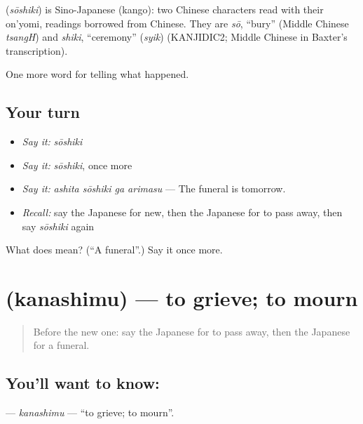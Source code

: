 \begin{cousinweb}
\textbf{} (\emph{sōshiki}) is Sino-Japanese (kango): two Chinese characters read with their on'yomi, readings borrowed from Chinese. They are \emph{sō}, \textquotedblleft{}bury\textquotedblright{} (Middle Chinese \emph{tsangH}) and \emph{shiki}, \textquotedblleft{}ceremony\textquotedblright{} (\emph{syik}) (KANJIDIC2; Middle Chinese in Baxter's transcription).
\end{cousinweb}

\begin{grammarlens}[title={What you've built}]
One more word for telling what happened.
\end{grammarlens}

\subsection*{Your turn}
\begin{itemize}
\raggedright
  \item \emph{Say it:} \emph{sōshiki}
  \item \emph{Say it:} \emph{sōshiki}, once more
  \item \emph{Say it:} \emph{ashita sōshiki ga arimasu} — The funeral is tomorrow.
  \item \emph{Recall:} say the Japanese for new, then the Japanese for to pass away, then say \emph{sōshiki} again
\end{itemize}

\begin{tcolorbox}[breakable,colback=teal!4,colframe=teal!35!black,title={Before you move on}]
What does  mean? (\textquotedblleft{}A funeral\textquotedblright{}.) Say it once more.
\end{tcolorbox}
\section[\texorpdfstring{\ja{かなしむ} (kanashimu)}{かなしむ (kanashimu)}]{ (kanashimu) — to grieve; to mourn}

\label{lesson:JA-C291-kanashimu}



\begin{quote}
Before the new one: say the Japanese for to pass away, then the Japanese for a funeral.
\end{quote}

\subsection*{You'll want to know: }
\textbf{} — \emph{kanashimu} — \textquotedblleft{}to grieve; to mourn\textquotedblright{}.

